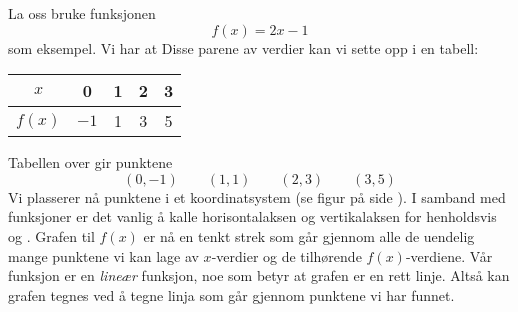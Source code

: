 La oss bruke funksjonen 
\[ f(x)=2x-1 \]
som eksempel. Vi har at
Disse parene av verdier kan vi sette opp i en tabell:
	\begin{center}
	\begin{tabular}{c | c |c |c|c}
		$ x $ & 0 & 1 & 2 & 3 \\ \hline
		$ f(x) $ &$  -1 $ & 1&3 &5
	\end{tabular}
\end{center}
Tabellen over gir punktene
\[ (0, -1)\quad\quad(1, 1)\quad\quad(2, 3)\quad\quad(3, 5) \]
Vi plasserer nå punktene i et koordinatsystem (se figur på side \pageref{funkfig}). I samband med funksjoner er det vanlig å kalle horisontalaksen og vertikalaksen for henholdsvis  og . 
Grafen til $ f(x) $ er nå en tenkt strek som går gjennom alle de uendelig mange punktene vi kan lage av $ x$-verdier og de tilhørende $ f(x) $-verdiene. Vår funksjon er en \textit{lineær} funksjon, noe som betyr at grafen er en rett linje. Altså kan grafen tegnes ved å tegne linja som går gjennom punktene vi har funnet.\vsk

